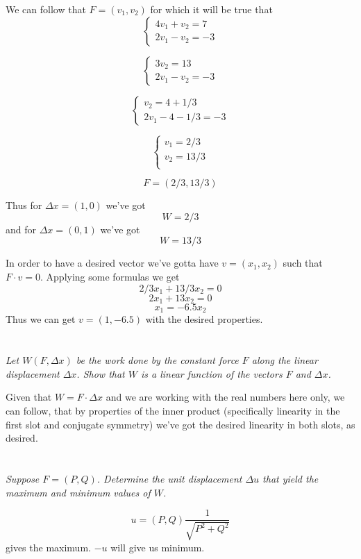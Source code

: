 \documentclass[11pt,oneside,titlepage]{book}
\begin{document}
We can follow that $F = (v_1, v_2)$ for which it will be true that
$$
\begin{cases}
  4 v_1 + v_2 = 7 \\
  2 v_1 - v_2 = -3
\end{cases}
$$

$$
\begin{cases}
  3v_2  = 13 \\
  2 v_1 - v_2 = -3
\end{cases}
$$

$$
\begin{cases}
  v_2  = 4 + 1/3 \\
  2 v_1 - 4 - 1/3 = -3
\end{cases}
$$

$$
\begin{cases}
  v_1 = 2/3 \\ 
  v_2  = 13/3 \\
\end{cases}
$$

$$F = (2/3, 13/3)$$

Thus for $\Delta x = (1, 0)$ we've got
$$W  = 2/3$$
and for $\Delta x = (0, 1)$ we've got
$$W  = 13/3$$

In order to have a desired vector we've gotta have $v = (x_1, x_2)$ such that $F \cdot v = 0$.
Applying some formulas we get 
$$2/3 x_1 + 13/3 x_2 = 0$$
$$2 x_1 + 13 x_2 = 0$$
$$x_1 = -6.5 x_2$$
Thus we can get $v = (1, -6.5)$ with the desired properties.

\section{}

\textit{Let $W(F, \Delta x)$ be the work done by the constant force $F$ along the linear
  displacement $\Delta x$. Show that $W$ is a linear function of the vectors $F$ and
  $\Delta x $.}

Given that $W = F \cdot \Delta x$ and we are working with the real numbers here only,
we can follow, that by properties of the inner product (specifically linearity in the first slot
and conjugate symmetry) we've got the desired linearity in both slots, as desired.

\section{}

\textit{Suppose $F = (P, Q)$. Determine the unit displacement $\Delta u$
  that yield the maximum and minimum values of $W$.}

$$u = (P, Q) \frac{1}{\sqrt{P^2 + Q^2}}$$
gives the maximum. $-u$ will give us minimum.
\end{document}
